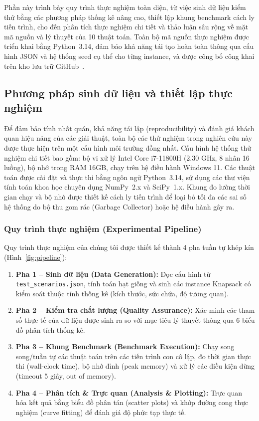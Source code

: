 \documentclass[fontsize=13pt,a4paper]{report}
\begin{document}
Phần này trình bày quy trình thực nghiệm toàn diện, từ việc sinh dữ liệu kiểm thử bằng các phương pháp thống kê nâng cao, thiết lập khung benchmark cách ly tiến trình, cho đến phân tích thực nghiệm chi tiết và thảo luận sâu rộng về mặt mã nguồn và lý thuyết của 10 thuật toán. Toàn bộ mã nguồn thực nghiệm được triển khai bằng Python~3.14, đảm bảo khả năng tái tạo hoàn toàn thông qua cấu hình JSON và hệ thống seed cụ thể cho từng instance, và được công bố công khai trên kho lưu trữ GitHub~\cite{source_code}.

\subsection{Phương pháp sinh dữ liệu và thiết lập thực nghiệm}
\label{subsec:setup}

Để đảm bảo tính nhất quán, khả năng tái lập (reproducibility) và đánh giá khách quan hiệu năng của các giải thuật, toàn bộ các thử nghiệm trong nghiên cứu này được thực hiện trên một cấu hình môi trường đồng nhất. Cấu hình hệ thống thử nghiệm chi tiết bao gồm: bộ vi xử lý Intel Core i7-11800H (2.30 GHz, 8 nhân 16 luồng), bộ nhớ trong RAM 16GB, chạy trên hệ điều hành Windows 11. Các thuật toán được cài đặt và thực thi bằng ngôn ngữ Python~3.14, sử dụng các thư viện tính toán khoa học chuyên dụng NumPy~2.x và SciPy~1.x. Khung đo lường thời gian chạy và bộ nhớ được thiết kế cách ly tiến trình để loại bỏ tối đa các sai số hệ thống do bộ thu gom rác (Garbage Collector) hoặc hệ điều hành gây ra.

\subsubsection{Quy trình thực nghiệm (Experimental Pipeline)}
\label{subsubsec:pipeline}

Quy trình thực nghiệm của chúng tôi được thiết kế thành 4 pha tuần tự khép kín (Hình~\ref{fig:pipeline}):
\begin{enumerate}[leftmargin=*]
    \item \textbf{Pha 1 -- Sinh dữ liệu (Data Generation):} Đọc cấu hình từ \texttt{test\_scenarios.json}, tính toán hạt giống và sinh các instance Knapsack có kiểm soát thuộc tính thống kê (kích thước, sức chứa, độ tương quan).
    \item \textbf{Pha 2 -- Kiểm tra chất lượng (Quality Assurance):} Xác minh các tham số thực tế của dữ liệu được sinh ra so với mục tiêu lý thuyết thông qua 6 biểu đồ phân tích thống kê.
    \item \textbf{Pha 3 -- Khung Benchmark (Benchmark Execution):} Chạy song song/tuần tự các thuật toán trên các tiến trình con cô lập, đo thời gian thực thi (wall-clock time), bộ nhớ đỉnh (peak memory) và xử lý các điều kiện dừng (timeout 5 giây, out of memory).
    \item \textbf{Pha 4 -- Phân tích \& Trực quan (Analysis \& Plotting):} Trực quan hóa kết quả bằng biểu đồ phân tán (scatter plots) và khớp đường cong thực nghiệm (curve fitting) để đánh giá độ phức tạp thực tế.
\end{enumerate}
\end{document}
